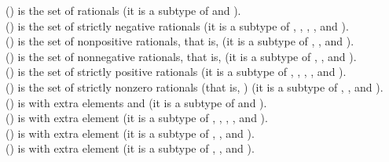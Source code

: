 \begin{tabbing}
 () is the set of rationals
(it is a subtype of  and ).
\\
 () is the set of strictly negative rationals
(it is a subtype of , , , , and ).
\\
 () is the set of nonpositive rationals, that is, 
(it is a subtype of , , and ).
\\
 () is the set of nonnegative rationals, that is, 
(it is a subtype of , , and ).
\\
 () is the set of strictly positive rationals
(it is a subtype of , , , , and ).
\\
 () is the set of strictly nonzero rationals (that is, )
(it is a subtype of , , and ).
\\
 () is  with extra elements \EXP{+\infty} and \EXP{-\infty}
(it is a subtype of  and ).
\\
 () is  with extra element \EXP{-\infty}
(it is a subtype of , , , , and ).
\\
 () is  with extra element \EXP{-\infty}
(it is a subtype of , , and ).
\\
 () is  with extra element \EXP{+\infty}
(it is a subtype of , , and ).
\\

\end{tabbing}
